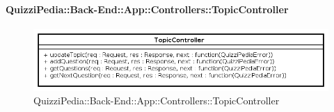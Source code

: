 \paragraph{QuizziPedia::Back-End::App::Controllers::TopicController}
\label{QuizziPedia::Back-End::App::Controllers::TopicController}
\begin{figure}[ht]
	\centering
	\includegraphics[scale=0.45]{UML/Classi/Back-End/QuizziPedia_Back-End_App_Controllers_topicController.png}
	\caption{QuizziPedia::Back-End::App::Controllers::TopicController}
\end{figure}
\FloatBarrier
